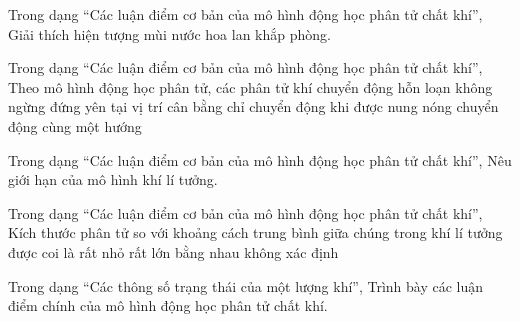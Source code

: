 \begin{ex}
Trong dạng “Các luận điểm cơ bản của mô hình động học phân tử chất khí”, Giải thích hiện tượng mùi nước hoa lan khắp phòng.
\choiceTF

\end{ex}

\begin{ex}
Trong dạng “Các luận điểm cơ bản của mô hình động học phân tử chất khí”, Theo mô hình động học phân tử, các phân tử khí
\choice
{\True chuyển động hỗn loạn không ngừng}
{đứng yên tại vị trí cân bằng}
{chỉ chuyển động khi được nung nóng}
{chuyển động cùng một hướng}
\end{ex}

\begin{ex}
Trong dạng “Các luận điểm cơ bản của mô hình động học phân tử chất khí”, Nêu giới hạn của mô hình khí lí tưởng.
\choiceTF

\end{ex}

\begin{ex}
Trong dạng “Các luận điểm cơ bản của mô hình động học phân tử chất khí”, Kích thước phân tử so với khoảng cách trung bình giữa chúng trong khí lí tưởng được coi là
\choice
{\True rất nhỏ}
{rất lớn}
{bằng nhau}
{không xác định}
\end{ex}

\begin{ex}
Trong dạng “Các thông số trạng thái của một lượng khí”, Trình bày các luận điểm chính của mô hình động học phân tử chất khí.
\choiceTF

\end{ex}

